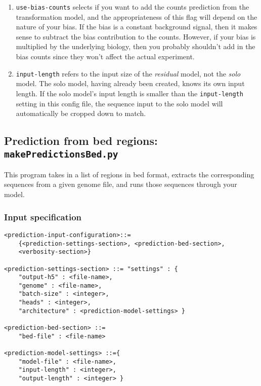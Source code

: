 \documentclass{article}
\begin{document}
\begin{enumerate}
    \item \texttt{use-bias-counts} selects if you want to add the counts prediction from the
        transformation model, and the appropriateness of this flag will depend on the nature
        of your bias.
        If the bias is a constant background signal, then it makes sense to subtract the bias
        contribution to the counts.
        However, if your bias is multiplied by the underlying biology, then you probably
        shouldn't add in the bias counts since they won't affect the actual experiment.
    \item \texttt{input-length} refers to the input size of the \emph{residual} model, not
        the \emph{solo} model.
        The solo model, having already been created, knows its own input length.
        If the solo model's input length is smaller than the \texttt{input-length} setting
        in this config file, the sequence input to the solo model will automatically
        be cropped down to match.
\end{enumerate}




\newpage

\subsection{Prediction from bed regions: \texttt{makePredictionsBed.py}}

This program takes in a list of regions in bed format, extracts the corresponding sequences from
a given genome file, and runs those sequences through your model.


\subsubsection{Input specification}

\begin{lstlisting}
<prediction-input-configuration>::=
    {<prediction-settings-section>, <prediction-bed-section>,
    <verbosity-section>}

<prediction-settings-section> ::= "settings" : {
    "output-h5" : <file-name>,
    "genome" : <file-name>,
    "batch-size" : <integer>,
    "heads" : <integer>,
    "architecture" : <prediction-model-settings> }

<prediction-bed-section> ::=
    "bed-file" : <file-name>

<prediction-model-settings> ::={
    "model-file" : <file-name>,
    "input-length" : <integer>,
    "output-length" : <integer> }
\end{lstlisting}
\end{document}
